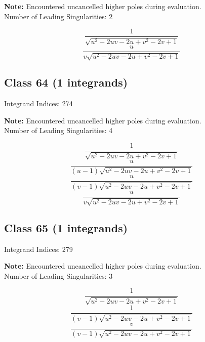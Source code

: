 \documentclass[11pt,a4paper]{article}
\begin{document}
\textbf{Note:} Encountered uncancelled higher poles during evaluation.\\[1em]

Number of Leading Singularities: 2

\begin{equation}
\frac{1}{\sqrt{u^2-2 u v-2 u+v^2-2 v+1}}
\end{equation}
\begin{equation}
\frac{u}{v \sqrt{u^2-2 u v-2 u+v^2-2 v+1}}
\end{equation}


\subsection*{Class 64 (1 integrands)}
Integrand Indices: 274

\textbf{Note:} Encountered uncancelled higher poles during evaluation.\\[1em]

Number of Leading Singularities: 4

\begin{equation}
\frac{1}{\sqrt{u^2-2 u v-2 u+v^2-2 v+1}}
\end{equation}
\begin{equation}
\frac{u}{(u-1) \sqrt{u^2-2 u v-2 u+v^2-2 v+1}}
\end{equation}
\begin{equation}
\frac{u}{(v-1) \sqrt{u^2-2 u v-2 u+v^2-2 v+1}}
\end{equation}
\begin{equation}
\frac{u}{v \sqrt{u^2-2 u v-2 u+v^2-2 v+1}}
\end{equation}


\subsection*{Class 65 (1 integrands)}
Integrand Indices: 279

\textbf{Note:} Encountered uncancelled higher poles during evaluation.\\[1em]

Number of Leading Singularities: 3

\begin{equation}
\frac{1}{\sqrt{u^2-2 u v-2 u+v^2-2 v+1}}
\end{equation}
\begin{equation}
\frac{1}{(v-1) \sqrt{u^2-2 u v-2 u+v^2-2 v+1}}
\end{equation}
\begin{equation}
\frac{v}{(v-1) \sqrt{u^2-2 u v-2 u+v^2-2 v+1}}
\end{equation}
\end{document}
